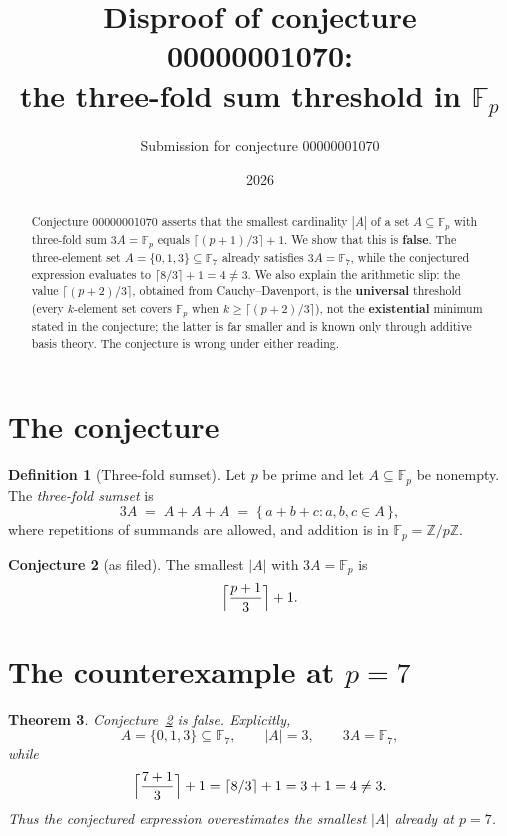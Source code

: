 \documentclass[11pt]{article}
\title{Disproof of conjecture 00000001070:\\
the three-fold sum threshold in $\mathbb{F}_p$}
\author{Submission for conjecture 00000001070}
\date{2026}
\newtheorem{theorem}{Theorem}
\theoremstyle{definition}
\newtheorem{definition}[theorem]{Definition}
\newtheorem{conjecture}[theorem]{Conjecture}
\theoremstyle{remark}
\begin{document}
\maketitle

\begin{abstract}
Conjecture 00000001070 asserts that the smallest cardinality $|A|$ of a set
$A \subseteq \mathbb{F}_p$ with three-fold sum $3A = \mathbb{F}_p$ equals
$\lceil (p+1)/3 \rceil + 1$. We show that this is \textbf{false}. The
three-element set $A = \{0,1,3\} \subseteq \mathbb{F}_7$ already satisfies
$3A = \mathbb{F}_7$, while the conjectured expression evaluates to
$\lceil 8/3 \rceil + 1 = 4 \neq 3$. We also explain the arithmetic slip: the
value $\lceil (p+2)/3 \rceil$, obtained from Cauchy--Davenport, is the
\textbf{universal} threshold (every $k$-element set covers $\mathbb{F}_p$ when
$k \ge \lceil (p+2)/3 \rceil$), not the \textbf{existential} minimum stated in
the conjecture; the latter is far smaller and is known only through additive
basis theory. The conjecture is wrong under either reading.
\end{abstract}

\section{The conjecture}

\begin{definition}[Three-fold sumset]
Let $p$ be prime and let $A \subseteq \mathbb{F}_p$ be nonempty. The
\emph{three-fold sumset} is
\[
  3A \;=\; A + A + A \;=\; \{\, a + b + c : a, b, c \in A \,\},
\]
where repetitions of summands are allowed, and addition is in
$\mathbb{F}_p = \mathbb{Z}/p\mathbb{Z}$.
\end{definition}

\begin{conjecture}[as filed]\label{conj}
The smallest $|A|$ with $3A = \mathbb{F}_p$ is
\[
  \Bigl\lceil \frac{p+1}{3} \Bigr\rceil + 1 .
\]
\end{conjecture}

\section{The counterexample at $p=7$}

\begin{theorem}\label{thm:main}
Conjecture~\ref{conj} is false. Explicitly,
\[
  A = \{0,1,3\} \subseteq \mathbb{F}_7,
  \qquad |A| = 3,
  \qquad 3A = \mathbb{F}_7,
\]
while
\[
  \Bigl\lceil \frac{7+1}{3} \Bigr\rceil + 1 = \lceil 8/3 \rceil + 1 = 3 + 1 = 4 \neq 3 .
\]
Thus the conjectured expression overestimates the smallest $|A|$ already at
$p = 7$.
\end{theorem}
\end{document}
